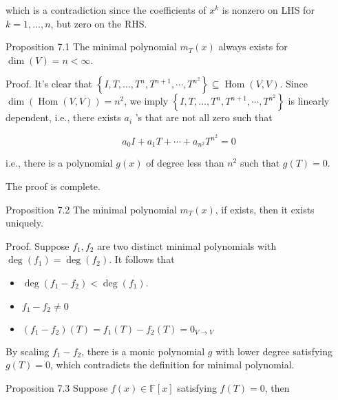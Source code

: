 \documentclass[11pt]{article}
\begin{document}
which is a contradiction since the coefficients of \({x}^{k}\) is nonzero on LHS for \(k = 1,\ldots ,n\), but zero on the RHS.

Proposition 7.1 The minimal polynomial \({m}_{T}\left( x\right)\) always exists for \(\dim \left( V\right)  = n < \infty\).

Proof. It’s clear that \(\left\{  {I,T,\ldots ,{T}^n,{T}^{n + 1},\cdots ,{T}^{n^2}}\right\}   \subseteq  \operatorname{Hom}\left( {V,V}\right)\). Since \(\dim \left( {\operatorname{Hom}\left( {V,V}\right) }\right)  = n^2\), we imply \(\left\{  {I,T,\ldots ,{T}^n,{T}^{n + 1},\cdots ,{T}^{n^2}}\right\}\) is linearly dependent, i.e., there exists \({a}_{i}\) ’s that are not all zero such that

\[
{a}_{0}I + {a}_1T + \cdots  + {a}_{n^2}{T}^{n^2} = 0
\]

i.e., there is a polynomial \(g\left( x\right)\) of degree less than \(n^2\) such that \(g\left( T\right)  = 0\).

The proof is complete.

Proposition 7.2 The minimal polynomial \({m}_{T}\left( x\right)\), if exists, then it exists uniquely.

Proof. Suppose \({f}_1,{f}_2\) are two distinct minimal polynomials with \(\deg \left( {f}_1\right)  = \deg \left( {f}_2\right)\). It follows that

\begin{itemize}
\item \(\deg \left( {{f}_1 - {f}_2}\right)  < \deg \left( {f}_1\right)\).
\end{itemize}

\begin{itemize}
\item \({f}_1 - {f}_2 \neq  0\)
\end{itemize}

\begin{itemize}
\item \(\left( {{f}_1 - {f}_2}\right) \left( T\right)  = {f}_1\left( T\right)  - {f}_2\left( T\right)  = {0}_{V \rightarrow  V}\)
\end{itemize}

By scaling \({f}_1 - {f}_2\), there is a monic polynomial \(g\) with lower degree satisfying \(g\left( T\right)  = 0\), which contradicts the definition for minimal polynomial.

Proposition 7.3 Suppose \(f\left( x\right)  \in  \mathbb{F}\left\lbrack  x\right\rbrack\) satisfying \(f\left( T\right)  = 0\), then
\end{document}
